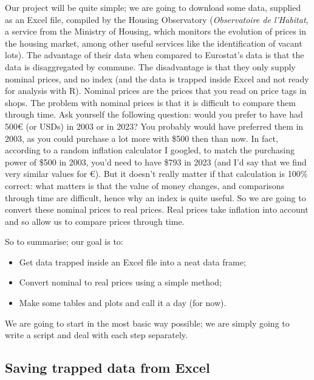 \documentclass[
  letterpaper,
  DIV=11,
  numbers=noendperiod]{scrartcl}
\providecommand{\tightlist}{%
  \setlength{\itemsep}{0pt}\setlength{\parskip}{0pt}}\usepackage{longtable,booktabs,array}
\begin{document}
Our project will be quite simple; we are going to download some data,
supplied as an Excel file, compiled by the Housing Observatory
(\emph{Observatoire de l'Habitat}, a service from the Ministry of
Housing, which monitors the evolution of prices in the housing market,
among other useful services like the identification of vacant lots). The
advantage of their data when compared to Eurostat's data is that the
data is disaggregated by commune. The disadvantage is that they only
supply nominal prices, and no index (and the data is trapped inside
Excel and not ready for analysis with R). Nominal prices are the prices
that you read on price tags in shops. The problem with nominal prices is
that it is difficult to compare them through time. Ask yourself the
following question: would you prefer to have had 500€ (or USDs) in 2003
or in 2023? You probably would have preferred them in 2003, as you could
purchase a lot more with \$500 then than now. In fact, according to a
random inflation calculator I googled, to match the purchasing power of
\$500 in 2003, you'd need to have \$793 in 2023 (and I'd say that we
find very similar values for €). But it doesn't really matter if that
calculation is 100\% correct: what matters is that the value of money
changes, and comparisons through time are difficult, hence why an index
is quite useful. So we are going to convert these nominal prices to real
prices. Real prices take inflation into account and so allow us to
compare prices through time.

So to summarise; our goal is to:

\begin{itemize}
\tightlist
\item
  Get data trapped inside an Excel file into a neat data frame;
\item
  Convert nominal to real prices using a simple method;
\item
  Make some tables and plots and call it a day (for now).
\end{itemize}

We are going to start in the most basic way possible; we are simply
going to write a script and deal with each step separately.

\newpage

\hypertarget{saving-trapped-data-from-excel}{%
\subsection{Saving trapped data from
Excel}\label{saving-trapped-data-from-excel}}
\end{document}
